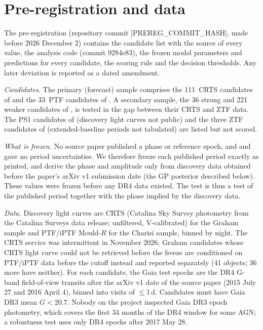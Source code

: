 \documentclass[RNAAS]{aastex631}
\newcommand{\NG}{111}                     %
\newcommand{\NC}{33}
\newcommand{\prereghash}{[PREREG\_COMMIT\_HASH]}
\newcommand{\codehash}{9284e83}
\begin{document}
\section{Pre-registration and data}

The pre-registration (repository commit \prereghash, made before 2026 December 2) contains
the candidate list with the source of every value, the analysis code (commit \codehash),
the frozen model parameters and predictions for every candidate, the scoring rule and the
decision thresholds. Any later deviation is reported as a dated amendment.

\textit{Candidates.} The primary (forecast) sample comprises the \NG\ CRTS candidates of
\citet{Graham2015} and the \NC\ PTF candidates of \citet{Charisi2016}. A secondary sample,
the 36 strong and 221 weaker candidates of \citet{Foustoul2025}, is tested in the gap
between their CRTS and ZTF data. The PS1 candidates of \citet{Liu2019} (discovery light
curves not public) and the three ZTF candidates of \citet{Chen2024} (extended-baseline
periods not tabulated) are listed but not scored.

\textit{What is frozen.} No source paper published a phase or reference epoch, and
\citet{Graham2015} and \citet{Charisi2016} gave no period uncertainties. We therefore
freeze each published period exactly as printed, and derive the phase and amplitude only
from discovery data obtained before the paper's arXiv v1 submission date (the GP posterior
described below). These values were frozen before any DR4 data existed. The test is thus a
test of the published period together with the phase implied by the discovery data.

\textit{Data.} Discovery light curves are CRTS (Catalina Sky Survey photometry from the
Catalina Surveys data release; unfiltered, V-calibrated) for the Graham sample and PTF/iPTF
Mould-$R$ \citep[IRSA;][]{Law2009} for the Charisi sample, binned by night. The CRTS service was
intermittent in November 2026; Graham candidates whose CRTS light curve could not be retrieved
before the freeze are conditioned on PTF/iPTF data before the cutoff instead and reported
separately (41 objects; 36 more have neither). For each candidate, the Gaia test epochs are the DR4 G-band
field-of-view transits after the arXiv v1 date of the source paper (2015 July 27 and 2016
April 4), binned into visits of $\leq$1\,d. Candidates must have Gaia DR3 mean $G<20.7$.
Nobody on the project inspected Gaia DR3 epoch photometry, which covers the first 34
months of the DR4 window for some AGN; a robustness test uses only DR4 epochs after 2017
May 28.
\end{document}
